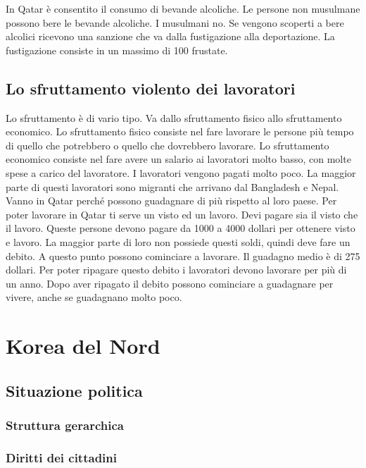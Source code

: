 \documentclass[a4paper, 12pt]{article}
\begin{document}
In Qatar è consentito il consumo di bevande alcoliche. Le persone non musulmane possono bere le bevande alcoliche. I musulmani no. Se vengono scoperti a bere alcolici ricevono una sanzione che va dalla fustigazione alla deportazione. La fustigazione consiste in un massimo di 100 frustate.

\subsection{Lo sfruttamento violento dei lavoratori}

Lo sfruttamento è di vario tipo. Va dallo sfruttamento fisico allo sfruttamento  economico. Lo sfruttamento fisico consiste nel fare lavorare le persone più tempo di quello che potrebbero o quello che dovrebbero lavorare. Lo sfruttamento economico consiste nel fare avere un salario ai lavoratori molto basso, con molte spese a carico del lavoratore. I lavoratori vengono pagati molto poco. La maggior parte di questi lavoratori sono migranti che arrivano dal Bangladesh e Nepal. Vanno in Qatar perché possono guadagnare di più rispetto al loro paese. Per poter lavorare in Qatar ti serve un visto ed un lavoro. Devi pagare sia il visto che il lavoro. Queste persone devono pagare da 1000 a 4000 dollari per ottenere visto e lavoro. La maggior parte di loro non possiede questi soldi, quindi deve fare un debito. A questo punto possono cominciare a lavorare. Il guadagno medio è di 275 dollari. Per poter ripagare questo debito i lavoratori devono lavorare per più di un anno. Dopo aver ripagato il debito possono cominciare a guadagnare per vivere, anche se guadagnano molto poco.


\section{Korea del Nord}

\subsection{Situazione politica}

\subsubsection{Struttura gerarchica}

\subsubsection{Diritti dei cittadini}
\end{document}
